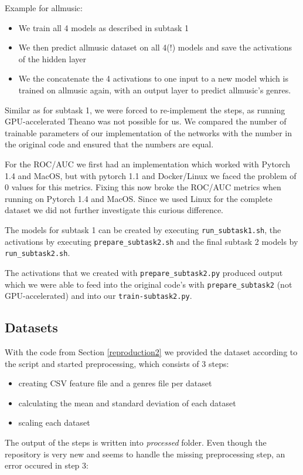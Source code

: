 \documentclass[sigconf,nonacm]{acmart}
\begin{document}
Example for allmusic: 
\begin{itemize}
  \item We train all 4 models as described in subtask 1
  \item We then predict allmusic dataset on all 4(!) models and save the activations of the hidden layer
  \item We the concatenate the 4 activations to one input
  to a new model which is trained on allmusic again, with an
  output layer to predict allmusic's genres.
\end{itemize}

Similar as for subtask 1, we were forced to re-implement the steps,
as running GPU-accelerated Theano was not possible for us.
We compared the number of trainable parameters of our implementation
of the networks with the number in the original code and ensured
that the numbers are equal.

For the ROC/AUC we first had an implementation which worked with
Pytorch 1.4 and MacOS, but with pytorch 1.1 and Docker/Linux
we faced the problem of 0 values for this metrics.
Fixing this now broke the ROC/AUC metrics when running on
Pytorch 1.4 and MacOS.
Since we used Linux for the complete dataset we did not further
investigate this curious difference.

The models for subtask 1 can be created by executing \texttt{run\_subtask1.sh},
the activations by executing \texttt{prepare\_subtask2.sh} and the final subtask 2
models by \texttt{run\_subtask2.sh}.

The activations that we created with \texttt{prepare\_subtask2.py}
produced output which we were able to feed into the
original code's with \texttt{prepare\_subtask2} (not GPU-accelerated)
and into our \texttt{train-subtask2.py}.

\subsection{Datasets}

With the code from Section \ref{reproduction2} we provided the dataset according to the script and started preprocessing, which consists of 3 steps:
\begin{itemize}
  \item creating CSV feature file and a genres file per dataset
  \item calculating the mean and standard deviation of each dataset
  \item scaling each dataset
\end{itemize}
The output of the steps is written into \textit{processed} folder.
Even though the repository is very new and seems to handle the missing preprocessing step, an error occured in step 3:
\end{document}
